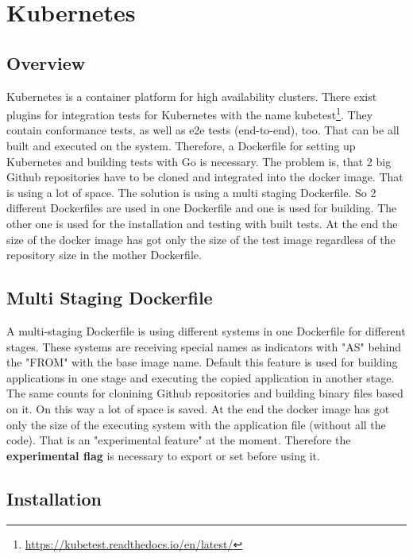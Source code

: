 \chapter{Kubernetes}\label{ch:kubernetes}

\section{Overview}

Kubernetes is a container platform for high availability clusters.
There exist plugins for integration tests for Kubernetes with the name kubetest\footnote{\url{https://kubetest.readthedocs.io/en/latest/}}. They contain conformance tests, as well as e2e tests (end-to-end), too.
That can be all built and executed on the system. Therefore, a Dockerfile for setting up Kubernetes and building tests with Go is necessary. The problem is, that 2 big Github repositories have to be cloned and integrated into the docker image. That is using a lot of space. The solution is using a multi staging Dockerfile. 
So 2 different Dockerfiles are used in one Dockerfile and one is used for building. The other one is used for the installation and testing with built tests. At the end the size of the docker image has got only the size of the test image regardless of the repository size in the mother Dockerfile.

\section{Multi Staging Dockerfile}

A multi-staging Dockerfile is using different systems in one Dockerfile for different stages. These systems are receiving special names as indicators with "AS" behind the "FROM" with the base image name. 
Default this feature is used for building applications in one stage and executing the copied application in another stage. The same counts for clonining Github repositories and building binary files based on it. On this way a lot of space is saved.
At the end the docker image has got only the size of the executing system with the application file (without all the code). 
That is an "experimental feature"  at the moment. Therefore the \textbf{experimental flag} is necessary to export or set before using it. 

\section{Installation}

